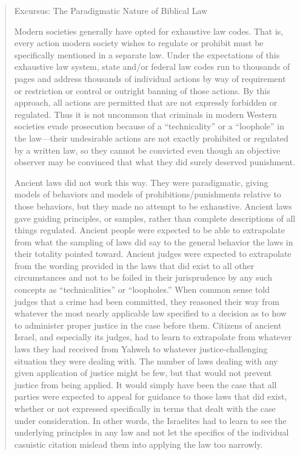 \documentclass[11pt]{article}
\begin{document}
\begin{quote}
Excursus: The Paradigmatic Nature of Biblical Law

Modern societies generally have opted for exhaustive law codes. That is, every action modern society wishes to regulate or prohibit must be specifically mentioned in a separate law.  Under the expectations of this exhaustive law system, state and/or federal law codes run to thousands of pages and address thousands of individual actions by way of requirement or restriction or control or outright banning of those actions.  By this approach, all actions are permitted that are not expressly forbidden or regulated.  Thus it is not uncommon that criminals in modern Western societies evade prosecution because of a “technicality” or a “loophole” in the law—their undesirable actions are not exactly prohibited or regulated by a written law, so they cannot be convicted even though an objective observer may be convinced that what they did surely deserved punishment.

Ancient laws did not work this way. They were paradigmatic, giving models of behaviors and models of prohibitions/punishments relative to those behaviors, but they made no attempt to be exhaustive.  Ancient laws gave guiding principles, or samples, rather than complete descriptions of all things regulated.  Ancient people were expected to be able to extrapolate from what the sampling of laws did say to the general behavior the laws in their totality pointed toward.  Ancient judges were expected to extrapolate from the wording provided in the laws that did exist to all other circumstances and not to be foiled in their jurisprudence by any such concepts as “technicalities” or “loopholes.”  When common sense told judges that a crime had been committed, they reasoned their way from whatever the most nearly applicable law specified to a decision as to how to administer proper justice in the case before them.  Citizens of ancient Israel, and especially its judges, had to learn to extrapolate from whatever laws they had received from Yahweh to whatever justice-challenging situation they were dealing with.  The number of laws dealing with any given application of justice might be few, but that would not prevent justice from being applied.  It would simply have been the case that all parties were expected to appeal for guidance to those laws that did exist, whether or not expressed specifically in terms that dealt with the case under consideration.  In other words, the Israelites had to learn to see the underlying principles in any law and not let the specifics of the individual casuistic citation mislead them into applying the law too narrowly.


\end{quote}
\end{document}
